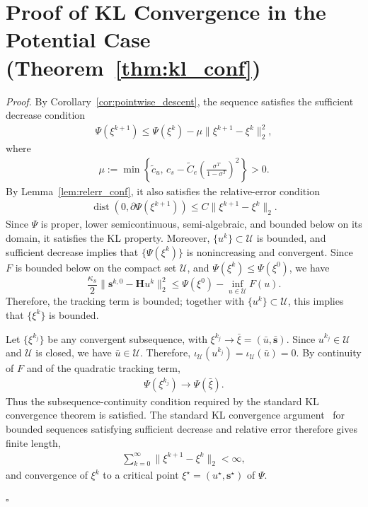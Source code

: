 \documentclass[letterpaper, 10 pt, conference]{ieeeconf} %
\newenvironment{proof}[1][Proof]{\par\noindent\textit{#1. }\ignorespaces}
  {\hfill$\square$\par}
\DeclareMathOperator{\dist}{dist}
\begin{document}
\section{Proof of KL Convergence in the Potential Case
(Theorem~\ref{thm:kl_conf})}
\label{app:kl_proof}
\begin{proof}
By Corollary~\ref{cor:pointwise_descent}, the sequence satisfies the sufficient decrease condition
\begin{align}
\Psi(\xi^{k+1})
\le
\Psi(\xi^k)
-
\mu\|\xi^{k+1}-\xi^k\|_2^2,
\end{align}
where
\begin{align}
\mu
:=
\min\left\{
\tilde c_u,\,
c_s-\tilde C_e
\left(\frac{\sigma^T}{1-\sigma^T}\right)^2
\right\}
>0 .
\end{align}
By Lemma~\ref{lem:relerr_conf}, it also satisfies the relative-error condition
\begin{align}
\dist(0,\partial\Psi(\xi^{k+1}))
\le
C\|\xi^{k+1}-\xi^k\|_2 .
\end{align}
Since \(\Psi\) is proper, lower semicontinuous, semi-algebraic, and bounded below on its domain, it satisfies the KL property. Moreover, \(\{u^k\}\subset\mathcal U\) is bounded, and sufficient decrease implies that \(\{\Psi(\xi^k)\}\) is nonincreasing and convergent. Since \(F\) is bounded below on the compact set \(\mathcal U\), and
\(\Psi(\xi^k)\le\Psi(\xi^0)\), we have
\begin{equation*}
\frac{\kappa_s}{2}
\|\mathbf s^{k,0}-\mathbf H u^k\|_2^2
\le
\Psi(\xi^0)-\inf_{u\in\mathcal U}F(u).
\end{equation*}
Therefore, the tracking term is bounded; together with \(\{u^k\}\subset\mathcal U\), this implies that \(\{\xi^k\}\) is bounded.

Let \(\{\xi^{k_j}\}\) be any convergent subsequence, with \(\xi^{k_j}\to\bar\xi=(\bar u,\bar{\mathbf s})\). Since \(u^{k_j}\in\mathcal U\) and \(\mathcal U\) is closed, we have \(\bar u\in\mathcal U\). Therefore, \(\iota_{\mathcal U}(u^{k_j})= \iota_{\mathcal U}(\bar u)=0\). By continuity of \(F\) and of the quadratic tracking term,
\begin{align}
\Psi(\xi^{k_j})\to\Psi(\bar\xi).
\end{align}
Thus the subsequence-continuity condition required by the standard KL convergence theorem is satisfied. The standard KL convergence argument~\cite{attouch_convergence_2013, bolte_clarke_2007} for bounded sequences satisfying sufficient decrease and relative error therefore gives finite length,
\begin{align}
\sum_{k=0}^\infty \|\xi^{k+1}-\xi^k\|_2<\infty,
\end{align}
and convergence of \(\xi^k\) to a critical point
\(\xi^\star=(u^\star,\mathbf s^\star)\) of \(\Psi\).


\end{proof}
\end{document}
